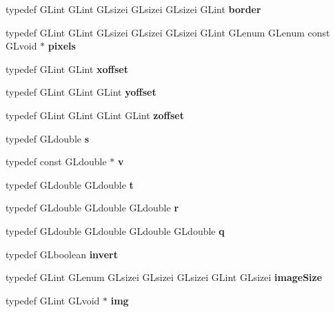 \begin{DoxyCompactItemize}
\item 
typedef G\+Lint G\+Lint G\+Lsizei G\+Lsizei G\+Lsizei G\+Lint {\bfseries border}\label{_s_d_l__opengl_8h_a6180492a53d6843c599d9934a5facf65}

\item 
typedef G\+Lint G\+Lint G\+Lsizei G\+Lsizei G\+Lsizei G\+Lint G\+Lenum G\+Lenum const G\+Lvoid $\ast$ {\bfseries pixels}\label{_s_d_l__opengl_8h_a314ae25bb13f298e0aaff5f9637afff8}

\item 
typedef G\+Lint G\+Lint {\bfseries xoffset}\label{_s_d_l__opengl_8h_ac20a0ffebf4c476650fcfa0633066f0e}

\item 
typedef G\+Lint G\+Lint G\+Lint {\bfseries yoffset}\label{_s_d_l__opengl_8h_a76dfb6803dcff61037ba688b7f4242b8}

\item 
typedef G\+Lint G\+Lint G\+Lint G\+Lint {\bfseries zoffset}\label{_s_d_l__opengl_8h_af04d9b91a10a38749f463a013e14c182}

\item 
typedef G\+Ldouble {\bfseries s}\label{_s_d_l__opengl_8h_ad585a1393cfa368fa9dc3d8ebff640d5}

\item 
typedef const G\+Ldouble $\ast$ {\bfseries v}\label{_s_d_l__opengl_8h_adfdba28282fbf886223676912be34ab4}

\item 
typedef G\+Ldouble G\+Ldouble {\bfseries t}\label{_s_d_l__opengl_8h_a00140d6f5c548b26daf170bf16e86a6d}

\item 
typedef G\+Ldouble G\+Ldouble G\+Ldouble {\bfseries r}\label{_s_d_l__opengl_8h_a31034e24af8271ed8267858116fe2e48}

\item 
typedef G\+Ldouble G\+Ldouble G\+Ldouble G\+Ldouble {\bfseries q}\label{_s_d_l__opengl_8h_afb30bc844faa48275d1c84294956a44b}

\item 
typedef G\+Lboolean {\bfseries invert}\label{_s_d_l__opengl_8h_afcc4054e54dc14717dc9df064f152b6b}

\item 
typedef G\+Lint G\+Lenum G\+Lsizei G\+Lsizei G\+Lsizei G\+Lint G\+Lsizei {\bfseries image\+Size}\label{_s_d_l__opengl_8h_a2f5934b61dbd601db8002b6a7bd2d13f}

\item 
typedef G\+Lint G\+Lvoid $\ast$ {\bfseries img}\label{_s_d_l__opengl_8h_a92ca64eaed2bef2c93999260bc6cf98e}


\end{DoxyCompactItemize}
